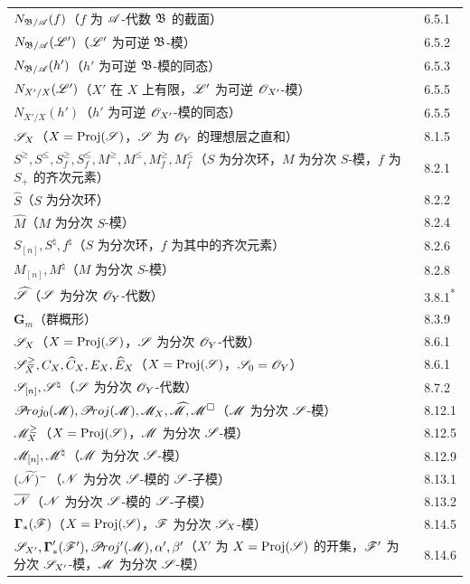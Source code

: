 \begin{longtable}{@{}p{}@{\hspace{1em}}p{}@{}}
$N_{\mathfrak B/\mathscr A}(f)$（$f$ 为 $\mathscr A$-代数 $\mathfrak B$ 的截面）&6.5.1\\
$N_{\mathfrak B/\mathscr A}(\mathscr L')$（$\mathscr L'$ 为可逆 $\mathfrak B$-模）&6.5.2\\
$N_{\mathfrak B/\mathscr A}(h')$（$h'$ 为可逆 $\mathfrak B$-模的同态）&6.5.3\\
$N_{X'/X}(\mathscr L')$（$X'$ 在 $X$ 上有限，$\mathscr L'$ 为可逆 $\mathscr O_{X'}$-模）&6.5.5\\
$N_{X'/X}(h')$（$h'$ 为可逆 $\mathscr O_{X'}$-模的同态）&6.5.5\\
$\mathscr S_X$（$X=\operatorname{Proj}(\mathscr S)$，$\mathscr S$ 为 $\mathscr O_Y$ 的理想层之直和）&8.1.5\\
$S^{\geq},S^{\leq},S_f^{\geq},S_f^{\leq},M^{\geq},M^{\leq},M_f^{\geq},M_f^{\leq}$（$S$ 为分次环，$M$ 为分次 $S$-模，$f$ 为 $S_+$ 的齐次元素）&8.2.1\\
$\widehat S$（$S$ 为分次环）&8.2.2\\
$\widehat M$（$M$ 为分次 $S$-模）&8.2.4\\
$S_{[n]},S^{\natural},f^{\natural}$（$S$ 为分次环，$f$ 为其中的齐次元素）&8.2.6\\
$M_{[n]},M^{\natural}$（$M$ 为分次 $S$-模）&8.2.8\\
$\widehat{\mathscr S}$（$\mathscr S$ 为分次 $\mathscr O_Y$-代数）&3.8.1\textsuperscript{*}\\
$\mathbf G_m$（群概形）&8.3.9\\
$\mathscr S_X$（$X=\operatorname{Proj}(\mathscr S)$，$\mathscr S$ 为分次 $\mathscr O_Y$-代数）&8.6.1\\
$\mathscr S_X^{\geq},C_X,\widehat C_X,E_X,\widehat E_X$（$X=\operatorname{Proj}(\mathscr S)$，$\mathscr S_0=\mathscr O_Y$）&8.6.1\\
$\mathscr S_{[n]},\mathscr S^{\natural}$（$\mathscr S$ 为分次 $\mathscr O_Y$-代数）&8.7.2\\
$\mathscr{P}\!roj_0(\mathscr M),\mathscr{P}\!roj(\mathscr M),\mathscr M_X,\widehat{\mathscr M},\mathscr M^\square$（$\mathscr M$ 为分次 $\mathscr S$-模）&8.12.1\\
$\mathscr M_X^{\geq}$（$X=\operatorname{Proj}(\mathscr S)$，$\mathscr M$ 为分次 $\mathscr S$-模）&8.12.5\\
$\mathscr M_{[n]},\mathscr M^{\natural}$（$\mathscr M$ 为分次 $\mathscr S$-模）&8.12.9\\
$(\widetilde{\mathscr N})^-$（$\mathscr N$ 为分次 $\mathscr S$-模的 $\mathscr S$-子模）&8.13.1\\
$\overline{\mathscr N}$（$\mathscr N$ 为分次 $\mathscr S$-模的 $\mathscr S$-子模）&8.13.2\\
$\boldsymbol\Gamma_*(\mathscr F)$（$X=\operatorname{Proj}(\mathscr S)$，$\mathscr F$ 为分次 $\mathscr S_X$-模）&8.14.5\\
$\mathscr S_{X'},\boldsymbol\Gamma'_*(\mathscr F'),\mathscr{P}\!roj'(\mathscr M),\alpha',\beta'$（$X'$ 为 $X=\operatorname{Proj}(\mathscr S)$ 的开集，$\mathscr F'$ 为分次 $\mathscr S_{X'}$-模，$\mathscr M$ 为分次 $\mathscr S$-模）&8.14.6\\
\end{longtable}
\endgroup

